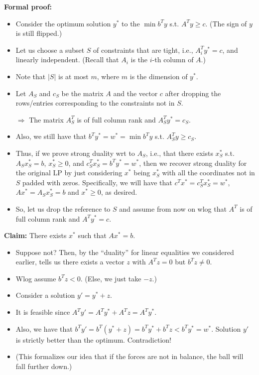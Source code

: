 \documentclass{article}
\begin{document}

{\bf Formal proof:}
\begin{itemize}
\item Consider the optimum solution $y^*$ to the $\min b^Ty$ s.t. $A^Ty \ge c$. (The sign of $y$ is still flipped.)
\item Let us choose a subset $S$ of constraints that are tight, i.e., $A_i^Ty^*=c$, and linearly independent. (Recall that $A_i$ is the $i$-th column of $A$.)
\item Note that $|S|$ is at most $m$, where $m$ is the dimension of $y^*$.
\item Let $A_S$ and $c_S$ be the matrix $A$ and the vector $c$ after dropping the rows/entries corresponding to the constraints not in $S$.

$\Rightarrow$ The matrix $A_S^T$ is of full column rank and $A_S^T y^*=c_S$.
\item Also, we still have that $b^Ty^*=w^*=\min b^Ty$ s.t. $A_S^Ty\geq c_S$.
\item Thus, if we prove strong duality wrt to $A_S$, i.e., that there exists $x_S^*$ s.t. $A_Sx_S^*=b$, $x_S^*\geq 0$, and $c_S^T x_S^*=b^T y^*=w^*$,  then we recover strong duality for the original LP by just considering $x^*$ being $x_S^*$ with all the coordinates not in $S$ padded with zeros. Specifically, we will have that $c^Tx^*=c_S^Tx_S^*=w^*$, $Ax^*=A_Sx_S^*=b$ and $x^*\geq 0$, as desired.
\item So, let us drop the reference to $S$ and assume from now on wlog that $A^T$ is of full column rank and $A^Ty^*=c$. 
\end{itemize}

{\bf Claim:} There exists $x^*$ such that $Ax^*=b$.
\begin{itemize}
\item Suppose not?  Then, by the ``duality'' for linear equalities we considered earlier, tells us there exists a vector $z$ with $A^Tz=0$ but $b^Tz\ne 0$. 
\item Wlog assume $b^Tz<0$.  (Else, we just take $-z$.)
\item Consider a solution $y'=y^*+z$. 
\item It is feasible since $A^Ty'=A^Ty^*+A^Tz=A^Ty^*$.
\item Also, we have that $b^Ty'=b^T(y^*+z)=b^Ty^*+b^Tz<b^Ty^*=w^*$. Solution $y'$ is strictly better than the optimum. Contradiction!
\item (This formalizes our idea that if the forces are not in balance, the
  ball will fall further down.)
\end{itemize}
\end{document}

